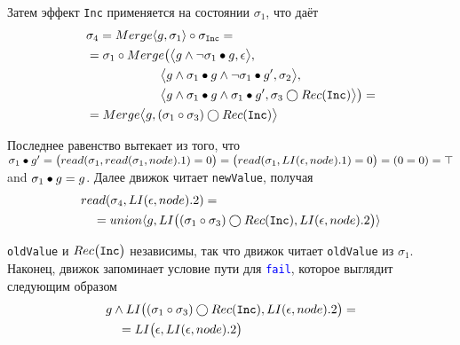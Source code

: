 \begin{exmp}
Затем эффект \texttt{Inc} применяется на состоянии $\sigma_1$, что даёт
\begin{align*}
&\sigma_4 = Merge{\langle g, \sigma_1\rangle}\circ\sigma_{\texttt{Inc}}=\\
&=\sigma_1\circ Merge\big(\big\langle g\wedge\neg \sigma_1\bullet g, \epsilon\big\rangle,\\ &\qquad\qquad\qquad\big\langle g\wedge\sigma_1\bullet g \wedge \neg \sigma_1\bullet g', \sigma_2\big\rangle,\\
&\qquad\qquad\qquad\big\langle g\wedge\sigma_1\bullet g\wedge \sigma_1\bullet g', \sigma_3\bigcirc Rec(\texttt{Inc})\big\rangle\big)=\\
&=Merge{\big\langle g, (\sigma_1\circ\sigma_3)\bigcirc Rec(\texttt{Inc})\big\rangle}
\end{align*}

Последнее равенство вытекает из того, что $\sigma_1\bullet g'=\big(read(\sigma_1,read(\sigma_1,node).1) = 0\big) = \big(read(\sigma_1,LI(\epsilon, node).1) = 0\big) = (0 = 0) = \top$ and $\sigma_1\bullet g = g$. Далее движок читает \texttt{newValue}, получая
\begin{align*}
&read(\sigma_4,LI(\epsilon, node).2)=\\
&\quad=union{\langle g, LI\big((\sigma_1\circ\sigma_3)\bigcirc Rec(\texttt{Inc}), LI(\epsilon, node).2\big)\rangle}
\end{align*}

\texttt{oldValue} и $Rec\big(\texttt{Inc}\big)$ независимы, так что движок читает \texttt{oldValue} из $\sigma_1$. Наконец, движок запоминает условие пути для \texttt{\textcolor{blue}{fail}}, которое выглядит следующим образом
\begin{align}\label{exmp:fail-pc}
&g \wedge LI\big((\sigma_1\circ\sigma_3)\bigcirc Rec(\texttt{Inc}), LI(\epsilon, node).2\big)=\\\notag
&\quad=LI\big(\epsilon, LI(\epsilon, node).2\big)
\end{align}
\end{exmp}

